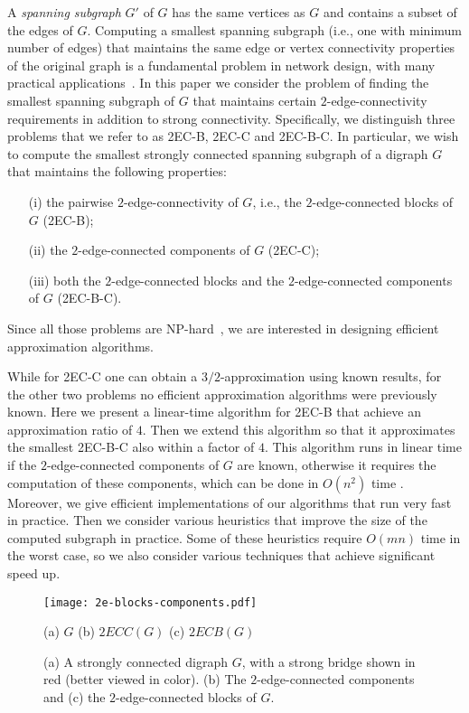 \documentclass[11pt]{article}
\begin{document}
A \emph{spanning subgraph} $G'$ of $G$ has the same vertices as $G$ and contains a subset of the edges of $G$.
Computing a smallest
spanning subgraph (i.e., one with minimum number of edges)
that maintains the same edge or vertex connectivity properties of the original graph is a fundamental problem in network design, with many practical applications~\cite{connectivity:nagamochi-ibaraki}.
In this paper we consider the problem of finding the smallest spanning subgraph of $G$ that
maintains  certain $2$-edge-connectivity requirements in addition to strong connectivity.
Specifically, we distinguish three problems that we refer to as \textsf{2EC-B}, \textsf{2EC-C} and \textsf{2EC-B-C}. In particular, we wish to compute the smallest strongly connected spanning subgraph of a digraph $G$ that maintains the following properties:
\begin{itemize}
\item[(i)] the pairwise $2$-edge-connectivity of $G$, i.e., the $2$-edge-connected blocks of $G$ (\textsf{2EC-B});
\item[(ii)] the $2$-edge-connected components of $G$ (\textsf{2EC-C});
\item[(iii)] both the $2$-edge-connected blocks and the $2$-edge-connected components of $G$ (\textsf{2EC-B-C}).
\end{itemize}
Since all those problems are NP-hard~\cite{GJ:NP},  we are interested in designing efficient approximation algorithms.

While for \textsf{2EC-C} one can obtain a $3/2$-approximation using known results, for the other two problems no efficient approximation algorithms were previously known.
Here we present a linear-time algorithm for \textsf{2EC-B} that achieve an approximation ratio of $4$.
Then we extend this algorithm so that it approximates the smallest \textsf{2EC-B-C} also within a factor of $4$.
This algorithm runs in linear time if the $2$-edge-connected components of $G$ are known, otherwise it requires the computation of these components, which can be done in $O(n^2)$ time \cite{2CC:HenzingerKL14}.
Moreover, we give efficient implementations of our algorithms that run very fast in practice.
Then we consider various heuristics that improve the size of the computed subgraph in practice.
Some of these heuristics require $O(mn)$ time in the worst case, so we also consider various techniques that achieve significant speed up.


\begin{figure}[t]
\begin{center}
\texttt{[image: 2e-blocks-components.pdf]}
\end{center}
\vspace{-0.2cm}
\hspace{2cm} (a) $G$ \hspace{3.2cm} (b) $2\mathit{ECC}(G)$ \hspace{3.2cm}  (c) $2\mathit{ECB}(G)$
\caption{(a) A strongly connected digraph $G$, with a strong bridge shown in red (better viewed in color).
(b) The $2$-edge-connected components and (c)
the $2$-edge-connected
blocks of $G$.}
\label{fig:2ebc}
\end{figure}
\end{document}
